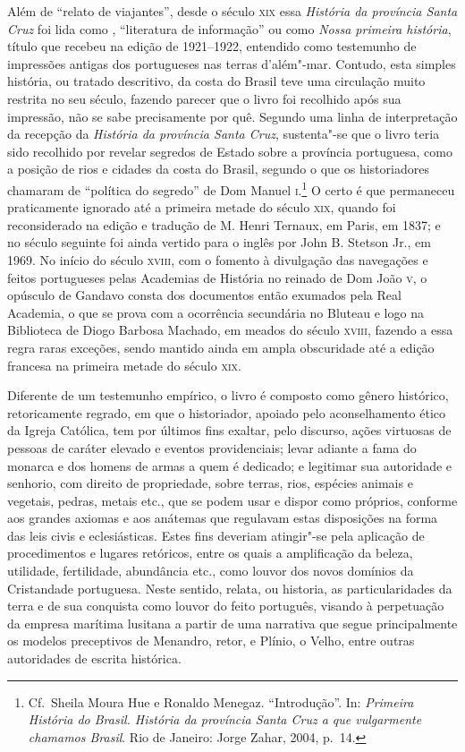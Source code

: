 Além de ``relato de viajantes'',  desde o século \textsc{xix} essa \textit{História da província Santa Cruz} foi lida como
, ``literatura de informação'' ou como \textit{Nossa
primeira história}, título que recebeu na edição de 1921--1922, entendido
como testemunho de impressões antigas dos portugueses nas terras
d'além"-mar. Contudo, esta simples história, ou tratado
descritivo, da costa do Brasil teve uma circulação muito restrita no
seu século, fazendo parecer que o livro foi recolhido após sua
impressão, não se sabe precisamente por quê. Segundo uma linha de
interpretação da recepção da \textit{História da província Santa Cruz},
sustenta"-se que o livro teria sido recolhido por revelar segredos de
Estado sobre a província portuguesa, como a posição de rios e cidades
da costa do Brasil, segundo o que os historiadores chamaram de
``política do segredo'' de Dom Manuel \textsc{i}.\footnote{ Cf.~Sheila 
Moura Hue e Ronaldo Menegaz.
``Introdução''. In:  \textit{Primeira História do
Brasil. História da província Santa Cruz a que vulgarmente chamamos
Brasil}. Rio de Janeiro: Jorge Zahar, 2004, p.~14.} O certo é que
permaneceu praticamente ignorado até a primeira metade do século \textsc{xix},
quando foi reconsiderado na edição e tradução de M. Henri Ternaux, em
Paris, em 1837; e no século seguinte foi ainda vertido para o inglês
por John B. Stetson Jr., em 1969. No início do século \textsc{xviii}, com o
fomento à divulgação das navegações e feitos portugueses pelas
Academias de História no reinado de Dom João \textsc{v}, o opúsculo de Gandavo
consta dos documentos então exumados pela Real Academia, o que se prova
com a ocorrência secundária no Bluteau e logo na Biblioteca de Diogo
Barbosa Machado, em meados do século \textsc{xviii}, fazendo a essa regra raras
exceções, sendo mantido ainda em ampla obscuridade até a edição
francesa na primeira metade do século \textsc{xix}.

Diferente de um testemunho empírico, o livro é composto como gênero
histórico, retoricamente regrado, em que o historiador, apoiado pelo
aconselhamento ético da Igreja Católica, tem por últimos fins exaltar,
pelo discurso, ações virtuosas de pessoas de caráter elevado e eventos
providenciais; levar adiante a fama do monarca e dos homens de armas a
quem é dedicado; e legitimar sua autoridade e senhorio, com direito de
propriedade, sobre terras, rios, espécies animais e vegetais, pedras,
metais etc., que se podem usar e dispor como próprios, conforme aos
grandes axiomas e aos anátemas que regulavam estas disposições na forma
das leis civis e eclesiásticas. Estes fins deveriam atingir"-se pela
aplicação de procedimentos e lugares retóricos, entre os quais a
amplificação da beleza, utilidade, fertilidade, abundância etc., como
louvor dos novos domínios da Cristandade portuguesa. Neste sentido,
relata, ou historia, as particularidades da terra e de sua conquista
como louvor do feito português, visando à perpetuação da empresa
marítima lusitana a partir de uma narrativa que segue principalmente os
modelos preceptivos de Menandro, retor, e Plínio, o Velho, entre outras
autoridades de escrita histórica.


